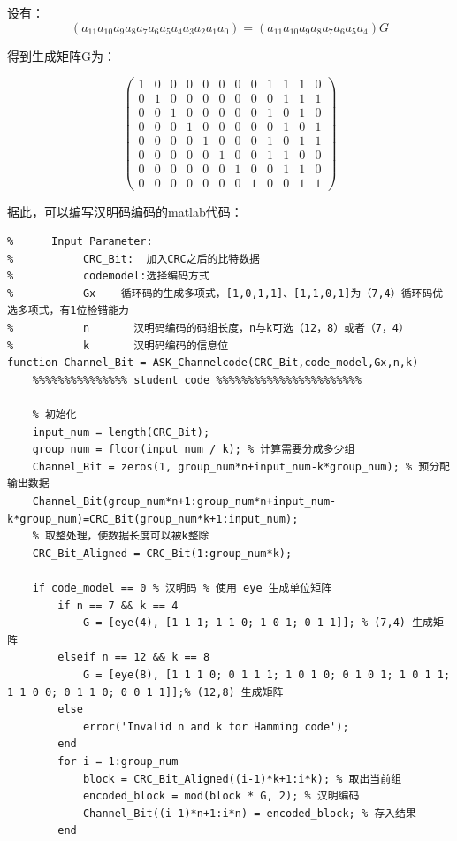 \documentclass[UTF8]{ctexart}
\begin{document}
设有：
$$(a_{11} a_{10} a_9 a_8 a_7 a_6 a_5 a_4 a_3 a_2 a_1 a_0)=(a_{11} a_{10} a_9 a_8 a_7 a_6 a_5 a_4)G$$

得到生成矩阵G为：

\begin{equation*}
    \begin{pmatrix}
        1 & 0 & 0 & 0 & 0 & 0 & 0 & 0 & 1 & 1 & 1 & 0 \\
        0 & 1 & 0 & 0 & 0 & 0 & 0 & 0 & 0 & 1 & 1 & 1 \\
        0 & 0 & 1 & 0 & 0 & 0 & 0 & 0 & 1 & 0 & 1 & 0 \\
        0 & 0 & 0 & 1 & 0 & 0 & 0 & 0 & 0 & 1 & 0 & 1 \\
        0 & 0 & 0 & 0 & 1 & 0 & 0 & 0 & 1 & 0 & 1 & 1 \\
        0 & 0 & 0 & 0 & 0 & 1 & 0 & 0 & 1 & 1 & 0 & 0 \\
        0 & 0 & 0 & 0 & 0 & 0 & 1 & 0 & 0 & 1 & 1 & 0 \\
        0 & 0 & 0 & 0 & 0 & 0 & 0 & 1 & 0 & 0 & 1 & 1 
    \end{pmatrix}
\end{equation*}

据此，可以编写汉明码编码的matlab代码：

\begin{lstlisting}[title=ASK\_Channelcode.m(汉明码部分), frame=shadowbox]
%  Parameter List:
%      Input Parameter:
%           CRC_Bit:  加入CRC之后的比特数据
%           codemodel:选择编码方式 
%           Gx    循环码的生成多项式，[1,0,1,1]、[1,1,0,1]为（7,4）循环码优选多项式，有1位检错能力
%           n       汉明码编码的码组长度，n与k可选（12，8）或者（7，4）
%           k       汉明码编码的信息位
function Channel_Bit = ASK_Channelcode(CRC_Bit,code_model,Gx,n,k)
    %%%%%%%%%%%%%%% student code %%%%%%%%%%%%%%%%%%%%%%%      
  
    % 初始化
    input_num = length(CRC_Bit);
    group_num = floor(input_num / k); % 计算需要分成多少组
    Channel_Bit = zeros(1, group_num*n+input_num-k*group_num); % 预分配输出数据
    Channel_Bit(group_num*n+1:group_num*n+input_num-k*group_num)=CRC_Bit(group_num*k+1:input_num);
    % 取整处理，使数据长度可以被k整除
    CRC_Bit_Aligned = CRC_Bit(1:group_num*k);
  
    if code_model == 0 % 汉明码 % 使用 eye 生成单位矩阵
        if n == 7 && k == 4
            G = [eye(4), [1 1 1; 1 1 0; 1 0 1; 0 1 1]]; % (7,4) 生成矩阵
        elseif n == 12 && k == 8
            G = [eye(8), [1 1 1 0; 0 1 1 1; 1 0 1 0; 0 1 0 1; 1 0 1 1; 1 1 0 0; 0 1 1 0; 0 0 1 1]];% (12,8) 生成矩阵
        else
            error('Invalid n and k for Hamming code');
        end
        for i = 1:group_num
            block = CRC_Bit_Aligned((i-1)*k+1:i*k); % 取出当前组
            encoded_block = mod(block * G, 2); % 汉明编码
            Channel_Bit((i-1)*n+1:i*n) = encoded_block; % 存入结果
        end  
\end{lstlisting}
\end{document}
